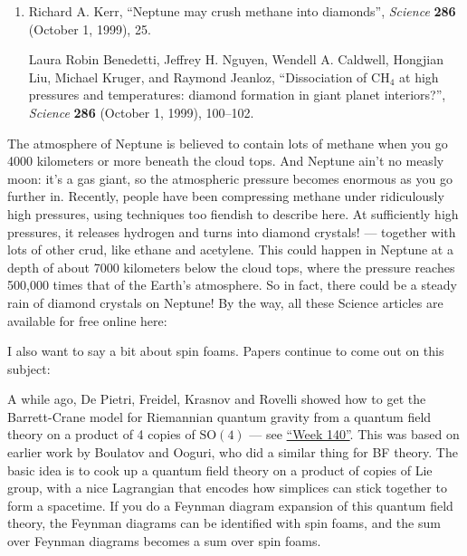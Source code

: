 \documentclass{article}
\def\tightlist{}
\renewcommand{\texttt}[1]{%
  \begingroup
  \ttfamily
  \begingroup\lccode`~=`/\lowercase{\endgroup\def~}{/\discretionary{}{}{}}%
  \begingroup\lccode`~=`[\lowercase{\endgroup\def~}{[\discretionary{}{}{}}%
  \begingroup\lccode`~=`.\lowercase{\endgroup\def~}{.\discretionary{}{}{}}%
  \catcode`/=\active\catcode`[=\active\catcode`.=\active
  \scantokens{#1\noexpand}%
  \endgroup
}
\begin{document}
\begin{enumerate}
\def\labelenumi{\arabic{enumi})}
\setcounter{enumi}{1}
\item
  Richard A. Kerr, ``Neptune may crush methane into diamonds'',
  \emph{Science} \textbf{286} (October 1, 1999), 25.

  Laura Robin Benedetti, Jeffrey H. Nguyen, Wendell A. Caldwell,
  Hongjian Liu, Michael Kruger, and Raymond Jeanloz, ``Dissociation of
  \(\mathrm{CH}_4\) at high pressures and temperatures: diamond
  formation in giant planet interiors?'', \emph{Science} \textbf{286}
  (October 1, 1999), 100--102.
\end{enumerate}

The atmosphere of Neptune is believed to contain lots of methane when
you go 4000 kilometers or more beneath the cloud tops. And Neptune ain't
no measly moon: it's a gas giant, so the atmospheric pressure becomes
enormous as you go further in. Recently, people have been compressing
methane under ridiculously high pressures, using techniques too fiendish
to describe here. At sufficiently high pressures, it releases hydrogen
and turns into diamond crystals! --- together with lots of other crud,
like ethane and acetylene. This could happen in Neptune at a depth of
about 7000 kilometers below the cloud tops, where the pressure reaches
500,000 times that of the Earth's atmosphere. So in fact, there could be
a steady rain of diamond crystals on Neptune! By the way, all these
Science articles are available for free online here:


I also want to say a bit about spin foams. Papers continue to come out
on this subject:


A while ago, De Pietri, Freidel, Krasnov and Rovelli showed how to get
the Barrett-Crane model for Riemannian quantum gravity from a quantum
field theory on a product of 4 copies of \(\mathrm{SO}(4)\) --- see
\protect\hyperlink{week140}{``Week 140''}. This was based on earlier
work by Boulatov and Ooguri, who did a similar thing for BF theory. The
basic idea is to cook up a quantum field theory on a product of copies
of Lie group, with a nice Lagrangian that encodes how simplices can
stick together to form a spacetime. If you do a Feynman diagram
expansion of this quantum field theory, the Feynman diagrams can be
identified with spin foams, and the sum over Feynman diagrams becomes a
sum over spin foams.
\end{document}

